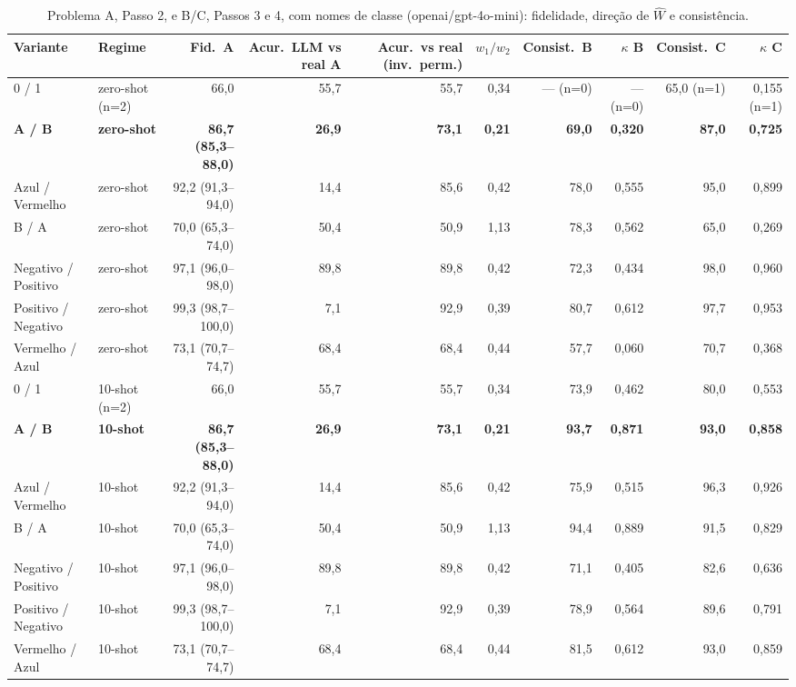 \begin{table}[htbp]
\centering
\small
\caption{Problema A, Passo 2, e B/C, Passos 3 e 4, com nomes de classe (openai/gpt-4o-mini): fidelidade, direção de $\hat{W}$ e consistência.}
\label{tab:bloco1_vies_nomes_classe_gpt4mini}
\begin{tabular}{llrrrrrrrr}
\toprule
Variante & Regime & Fid.\ A & Acur.\ LLM vs real A & Acur.\ vs real (inv.\ perm.) & $w_1/w_2$ & Consist.\ B & $\kappa$ B & Consist.\ C & $\kappa$ C \\
\midrule
0 / 1 & zero-shot (n=2) & 66,0 & 55,7 & 55,7 & 0,34 & — (n=0) & — (n=0) & 65,0 (n=1) & 0,155 (n=1) \\
\midrule
\textbf{A / B} & \textbf{zero-shot} & \textbf{86,7 (85,3–88,0)} & \textbf{26,9} & \textbf{73,1} & \textbf{0,21} & \textbf{69,0} & \textbf{0,320} & \textbf{87,0} & \textbf{0,725} \\
Azul / Vermelho & zero-shot & 92,2 (91,3–94,0) & 14,4 & 85,6 & 0,42 & 78,0 & 0,555 & 95,0 & 0,899 \\
B / A & zero-shot & 70,0 (65,3–74,0) & 50,4 & 50,9 & 1,13 & 78,3 & 0,562 & 65,0 & 0,269 \\
Negativo / Positivo & zero-shot & 97,1 (96,0–98,0) & 89,8 & 89,8 & 0,42 & 72,3 & 0,434 & 98,0 & 0,960 \\
Positivo / Negativo & zero-shot & 99,3 (98,7–100,0) & 7,1 & 92,9 & 0,39 & 80,7 & 0,612 & 97,7 & 0,953 \\
Vermelho / Azul & zero-shot & 73,1 (70,7–74,7) & 68,4 & 68,4 & 0,44 & 57,7 & 0,060 & 70,7 & 0,368 \\
\midrule
0 / 1 & 10-shot (n=2) & 66,0 & 55,7 & 55,7 & 0,34 & 73,9 & 0,462 & 80,0 & 0,553 \\
\midrule
\textbf{A / B} & \textbf{10-shot} & \textbf{86,7 (85,3–88,0)} & \textbf{26,9} & \textbf{73,1} & \textbf{0,21} & \textbf{93,7} & \textbf{0,871} & \textbf{93,0} & \textbf{0,858} \\
Azul / Vermelho & 10-shot & 92,2 (91,3–94,0) & 14,4 & 85,6 & 0,42 & 75,9 & 0,515 & 96,3 & 0,926 \\
B / A & 10-shot & 70,0 (65,3–74,0) & 50,4 & 50,9 & 1,13 & 94,4 & 0,889 & 91,5 & 0,829 \\
Negativo / Positivo & 10-shot & 97,1 (96,0–98,0) & 89,8 & 89,8 & 0,42 & 71,1 & 0,405 & 82,6 & 0,636 \\
Positivo / Negativo & 10-shot & 99,3 (98,7–100,0) & 7,1 & 92,9 & 0,39 & 78,9 & 0,564 & 89,6 & 0,791 \\
Vermelho / Azul & 10-shot & 73,1 (70,7–74,7) & 68,4 & 68,4 & 0,44 & 81,5 & 0,612 & 93,0 & 0,859 \\

\end{tabular}
\end{table}
